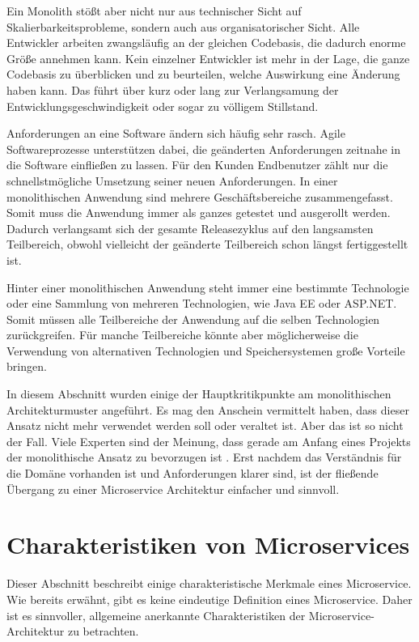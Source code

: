 Ein Monolith stößt aber nicht nur aus technischer Sicht auf Skalierbarkeitsprobleme, sondern auch aus organisatorischer Sicht. Alle Entwickler arbeiten zwangsläufig an der gleichen Codebasis, die dadurch enorme Größe annehmen kann. Kein einzelner Entwickler ist mehr in der Lage, die ganze Codebasis zu überblicken und zu beurteilen, welche Auswirkung eine Änderung haben kann. Das führt über kurz oder lang zur Verlangsamung der Entwicklungsgeschwindigkeit oder sogar zu völligem Stillstand.

Anforderungen an eine Software ändern sich häufig sehr rasch. Agile Softwareprozesse unterstützen dabei, die geänderten Anforderungen zeitnahe in die Software einfließen zu lassen. Für den Kunden \bzw Endbenutzer zählt nur die schnellstmögliche Umsetzung seiner neuen Anforderungen. In einer monolithischen Anwendung sind mehrere Geschäftsbereiche zusammengefasst. Somit muss die Anwendung immer als ganzes getestet und ausgerollt werden. Dadurch verlangsamt sich der gesamte Releasezyklus auf den langsamsten Teilbereich, obwohl vielleicht der geänderte Teilbereich schon längst fertiggestellt ist.

Hinter einer monolithischen Anwendung steht immer eine bestimmte Technologie oder eine Sammlung von mehreren Technologien, wie \zB Java EE oder ASP.NET. Somit müssen alle Teilbereiche der Anwendung auf die selben Technologien zurückgreifen. Für manche Teilbereiche könnte aber möglicherweise die Verwendung von alternativen Technologien und Speichersystemen große Vorteile bringen.

In diesem Abschnitt wurden einige der Hauptkritikpunkte am monolithischen Architekturmuster angeführt. Es mag den Anschein vermittelt haben, dass dieser Ansatz nicht mehr verwendet werden soll oder veraltet ist. Aber das ist so nicht der Fall. Viele Experten sind der Meinung, dass gerade am Anfang eines Projekts der monolithische Ansatz zu bevorzugen ist \cite{FowlerMolithFist}. Erst nachdem das Verständnis für die Domäne vorhanden ist und Anforderungen klarer sind, ist der fließende Übergang zu einer Microservice Architektur einfacher und sinnvoll. 

\section{Charakteristiken von Microservices}

Dieser Abschnitt beschreibt einige charakteristische Merkmale eines Microservice. Wie bereits erwähnt, gibt es keine eindeutige Definition eines Microservice. Daher ist es sinnvoller, allgemeine anerkannte Charakteristiken der Microservice-Architektur zu betrachten.
 
